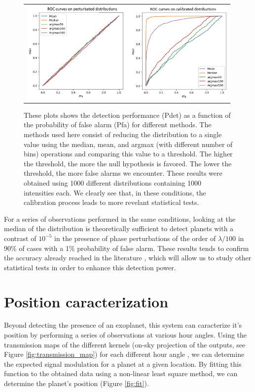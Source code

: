 \documentclass[]{spie}  %
\begin{document}
\begin{figure} [H]
    \begin{center}
    \begin{tabular}{c}
    \includegraphics[height=5cm]{img/ROC.png}
    \end{tabular}
    \end{center}
    \caption[ROC] 
    { \label{fig:ROC} 
    These plots shows the detection performance (Pdet) as a function of the probability of false alarm (Pfa) for different methods. The methods used here consist of reducing the distribution to a single value using the median, mean, and argmax (with different number of bins) operations and comparing this value to a threshold. The higher the threshold, the more the null hypothesis is favored. The lower the threshold, the more false alarms we encounter. These results were obtained using 1000 different distributions containing 1000 intensities each. We clearly see that, in these conditions, the calibration process leads to more revelant statistical tests.}
\end{figure}

For a series of observations performed in the same conditions, looking at the median of the distribution is theoretically sufficient to detect planets with a contrast of $10^{-5}$ in the presence of phase perturbations of the order of $\lambda / 100$ in 90\% of cases with a 1\% probability of false alarm. These results tends to confirm the accuracy already reached in the literature \cite{Cvetojevic et al. 2022}, which will allow us to study other statistical tests in order to enhance this detection power.

\section{Position caracterization}

Beyond detecting the presence of an exoplanet, this system can caracterize it's position by performing a series of observations at various hour angles. Using the transmission maps of the different kernels (on-sky projection of the outputs, see Figure \ref{fig:transmission_map}) for each different hour angle \cite{Chingaipe}, we can determine the expected signal modulation for a planet at a given location. By fitting this function to the obtained data using a non-linear least square method, we can determine the planet's position (Figure \ref{fig:fit}).
\end{document}
